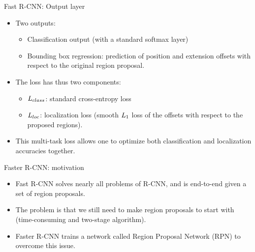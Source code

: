 \documentclass[xcolor=pdftex,dvipsnames,table]{beamer}
\begin{document}
\begin{frame}{Fast R-CNN: Output layer}
\begin{itemize}
\item Two outputs:
\begin{itemize}
	\item Classification output (with a standard softmax layer)
	\item Bounding box regression: prediction of position and extension offsets with respect to the original region proposal. 
\end{itemize}
\item The loss has thus two components: 
\begin{itemize}
   \item $L_{class}$: standard cross-entropy loss
   \item $L_{loc}$: localization loss (smooth $L_1$ loss of the offsets with respect to the proposed regions). 
\end{itemize}
   \item This multi-task loss allows one to optimize both classification and localization accuracies together. 
\end{itemize}
\end{frame}


\begin{frame}{Faster R-CNN: motivation}
\begin{itemize}
	\item Fast R-CNN solves nearly all problems of R-CNN, and is end-to-end given a set of region proposals.
	\item The problem is that we still need to make region proposals to start with (time-consuming and two-stage algorithm).
	\item Faster R-CNN \cite{Ren2017} trains a network called Region Proposal Network (RPN) to overcome this issue.
\end{itemize}
\end{frame}
\end{document}
